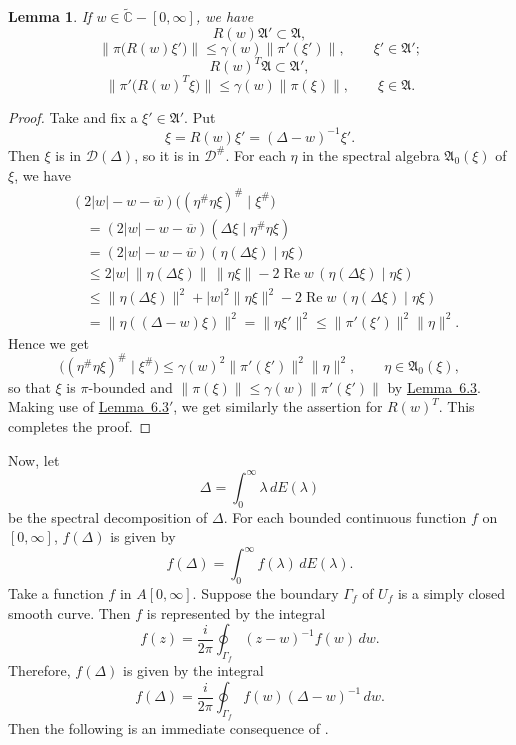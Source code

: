 \documentclass[12pt,b5paper,twoside]{article}
\theoremstyle{takesaki}
\newtheorem{lemma}{Lemma}[section]
\numberwithin{equation}{section}
\begin{document}
\begin{lemma}\label{lem:8.1}
If $w\in\widetilde{\mathbb C}-[0,\infty]$, we have
\[
  R(w)\mathfrak A'\subset\mathfrak A,
\]
\[
  \bigl\|\pi\bigl(R(w)\xi'\bigr)\bigr\|
  \leq \gamma(w)\|\pi'(\xi')\|,
  \qquad \xi'\in\mathfrak A';
\]
\[
  R(w)^T\mathfrak A\subset\mathfrak A',
\]
\[
  \bigl\|\pi'\bigl(R(w)^T\xi\bigr)\bigr\|
  \leq \gamma(w)\|\pi(\xi)\|,
  \qquad \xi\in\mathfrak A.
\]
\end{lemma}

\begin{proof}
Take and fix a $\xi'\in\mathfrak A'$. Put
\[
  \xi=R(w)\xi'=(\Delta-w)^{-1}\xi'.
\]
Then $\xi$ is in $\mathcal D(\Delta)$, so it is in $\mathcal D^{\#}$.
For each $\eta$ in the spectral algebra $\mathfrak A_0(\xi)$ of $\xi$, we
have
\begin{align*}
 &(2|w|-w-\overline w)\bigl((\eta^{\#}\eta\xi)^{\#}\mid\xi^{\#}\bigr) \\
 &\quad=(2|w|-w-\overline w)(\Delta\xi\mid\eta^{\#}\eta\xi) \\
 &\quad=(2|w|-w-\overline w)(\eta(\Delta\xi)\mid\eta\xi) \\
 &\quad\leq 2|w|\,\|\eta(\Delta\xi)\|\,\|\eta\xi\|
       -2\operatorname{Re}w\,(\eta(\Delta\xi)\mid\eta\xi) \\
 &\quad\leq \|\eta(\Delta\xi)\|^2+|w|^2\|\eta\xi\|^2
       -2\operatorname{Re}w\,(\eta(\Delta\xi)\mid\eta\xi) \\
 &\quad=\|\eta((\Delta-w)\xi)\|^2
       =\|\eta\xi'\|^2
       \leq \|\pi'(\xi')\|^2\|\eta\|^2.
\end{align*}
Hence we get
\[
  \bigl((\eta^{\#}\eta\xi)^{\#}\mid\xi^{\#}\bigr)
  \leq \gamma(w)^2\|\pi'(\xi')\|^2\|\eta\|^2,
  \qquad \eta\in\mathfrak A_0(\xi),
\]
so that $\xi$ is $\pi$-bounded and
$\|\pi(\xi)\|\leq\gamma(w)\|\pi'(\xi')\|$ by
\hyperref[lem:6.3]{Lemma~6.3}.  Making use of
\hyperref[lem:6.3-prime]{Lemma~6.3$'$}, we get similarly the assertion
for $R(w)^T$.  This completes the proof.
\end{proof}

Now, let
\begin{equation}
  \Delta=\int_0^\infty \lambda\,dE(\lambda)
  \tag{8.3}\label{eq:8.3}
\end{equation}
be the spectral decomposition of $\Delta$.  For each bounded continuous
function $f$ on $[0,\infty]$, $f(\Delta)$ is given by
\[
  f(\Delta)=\int_0^\infty f(\lambda)\,dE(\lambda).
\]
Take a function $f$ in $A[0,\infty]$.  Suppose the boundary $\Gamma_f$
of $U_f$ is a simply closed smooth curve.  Then $f$ is represented by
the integral
\[
  f(z)=\frac{i}{2\pi}\oint_{\Gamma_f}(z-w)^{-1}f(w)\,dw.
\]
Therefore, $f(\Delta)$ is given by the integral
\begin{equation}
  f(\Delta)=\frac{i}{2\pi}\oint_{\Gamma_f}
  f(w)(\Delta-w)^{-1}\,dw.
  \tag{8.4}\label{eq:8.4}
\end{equation}
Then the following is an immediate consequence of
.
\end{document}
